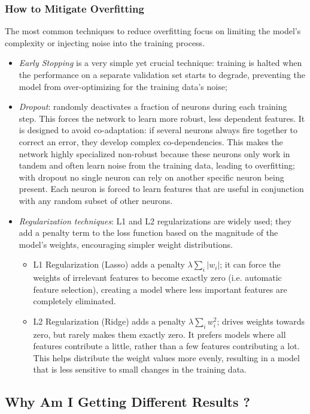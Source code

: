 \subsubsection{How to Mitigate Overfitting}

The most common techniques to reduce overfitting focus on limiting the model's complexity or injecting noise into the training process.
\begin{itemize}
\item \textit{Early Stopping} is a very simple yet crucial technique: training is halted when the performance on a separate validation set starts to degrade, preventing the model from over-optimizing for the training data's noise;
\item \textit{Dropout}: randomly deactivates a fraction of neurons during each training step. This forces the network to learn more robust, less dependent features. It is designed to avoid co-adaptation:
 if several neurons always fire together to correct an error, they develop complex co-dependencies. This makes the network highly specialized non-robust because these neurons only work in tandem and often learn noise from the training data, leading to overfitting; with dropout no single neuron can rely on another specific neuron being present. Each neuron is forced to learn features that are useful in conjunction with any random subset of other neurons.
\item \textit{Regularization techniques}: L1 and L2 regularizations are widely used; they add a penalty term to the loss function based on the magnitude of the model's weights, encouraging simpler weight distributions.
	\begin{itemize}
		\item L1 Regularization (Lasso) adds a penalty $\lambda\sum_i |w_i|$; it can force the weights of irrelevant features to become exactly zero (i.e. automatic feature selection), creating a model where less important features are completely eliminated.
		\item L2 Regularization (Ridge) adds a penalty $\lambda\sum_i w_i^2$; drives weights towards zero, but rarely makes them exactly zero. It prefers models where all features contribute a little, rather than a few features contributing a lot. This helps distribute the weight values more evenly, resulting in a model that is less sensitive to small changes in the training data.
\end{itemize}
\end{itemize}

\subsection{Why Am I Getting Different Results ?}

